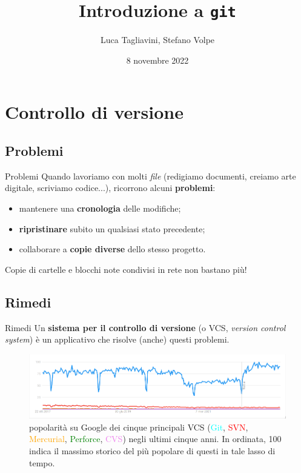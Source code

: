 \documentclass{beamer}
\title{Introduzione a \texttt{git}}
\author{Luca Tagliavini, Stefano Volpe}
\institute{Università di Bologna, corso di Laurea in Informatica}
\date{8 novembre 2022}
\begin{document}
\begin{frame} 
  \titlepage
\end{frame}

\section{Controllo di versione}

\subsection{Problemi}
\begin{frame}{Problemi}
  Quando lavoriamo con molti \emph{file} (redigiamo documenti, creiamo arte
  digitale, scriviamo codice...), ricorrono alcuni \textbf{problemi}:\pause
  \begin{itemize}
    \item<1-> mantenere una \textbf{cronologia} delle modifiche;\pause
    \item<2-> \textbf{ripristinare} subito un qualsiasi stato precedente;\pause
    \item<3-> collaborare a \textbf{copie diverse} dello stesso progetto.\pause
  \end{itemize}
  Copie di cartelle e blocchi note condivisi in rete non bastano più!
\end{frame}

\subsection{Rimedi}
\begin{frame}{Rimedi}
  Un \textbf{sistema per il controllo di versione} (o VCS, \emph{version control
  system}) è un applicativo che risolve (anche) questi problemi.\pause
  \begin{figure}
    \includegraphics[width=\textwidth]{assets/vcs-popularity.png}
    \caption{popolarità su Google dei cinque principali VCS
    (\textcolor{cyan}{Git}, \textcolor{red}{SVN},
    \textcolor{orange}{Mercurial}, \textcolor{green}{Perforce},
    \textcolor{violet}{CVS}) negli ultimi cinque anni. In ordinata, 100 indica il
    massimo storico del più popolare di questi in tale lasso di tempo.}
  \end{figure}
\end{frame}
\end{document}

